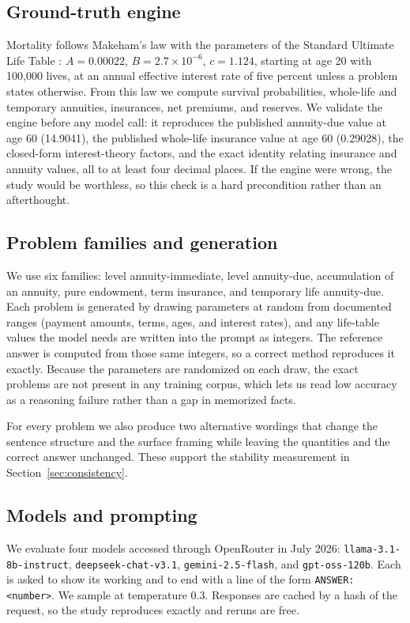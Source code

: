 \documentclass{article}
\begin{document}
\subsection{Ground-truth engine}
Mortality follows Makeham's law with the parameters of the Standard Ultimate Life Table \citep{dickson2020alm}: $A = 0.00022$, $B = 2.7\times10^{-6}$, $c = 1.124$, starting at age 20 with 100{,}000 lives, at an annual effective interest rate of five percent unless a problem states otherwise. From this law we compute survival probabilities, whole-life and temporary annuities, insurances, net premiums, and reserves. We validate the engine before any model call: it reproduces the published annuity-due value at age 60 (14.9041), the published whole-life insurance value at age 60 (0.29028), the closed-form interest-theory factors, and the exact identity relating insurance and annuity values, all to at least four decimal places. If the engine were wrong, the study would be worthless, so this check is a hard precondition rather than an afterthought.

\subsection{Problem families and generation}
We use six families: level annuity-immediate, level annuity-due, accumulation of an annuity, pure endowment, term insurance, and temporary life annuity-due. Each problem is generated by drawing parameters at random from documented ranges (payment amounts, terms, ages, and interest rates), and any life-table values the model needs are written into the prompt as integers. The reference answer is computed from those same integers, so a correct method reproduces it exactly. Because the parameters are randomized on each draw, the exact problems are not present in any training corpus, which lets us read low accuracy as a reasoning failure rather than a gap in memorized facts.

For every problem we also produce two alternative wordings that change the sentence structure and the surface framing while leaving the quantities and the correct answer unchanged. These support the stability measurement in Section~\ref{sec:consistency}.

\subsection{Models and prompting}
We evaluate four models accessed through OpenRouter in July 2026: \texttt{llama-3.1-8b-instruct}, \texttt{deepseek-chat-v3.1}, \texttt{gemini-2.5-flash}, and \texttt{gpt-oss-120b}. Each is asked to show its working and to end with a line of the form \texttt{ANSWER: <number>}. We sample at temperature 0.3. Responses are cached by a hash of the request, so the study reproduces exactly and reruns are free.
\end{document}

